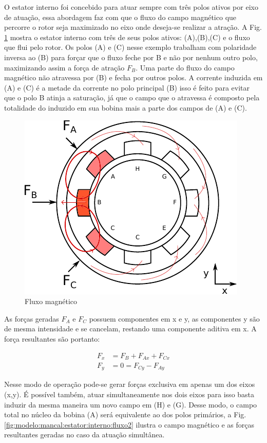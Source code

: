 O estator interno foi concebido para atuar sempre com três polos ativos por eixo de atuação, essa abordagem faz com que o fluxo do campo magnético que percorre o rotor seja maximizado no eixo onde deseja-se realizar a atração. A Fig. \ref{fig:modelo:mancal:estator:interno:fluxo} mostra o estator interno com três de seus polos ativos: (A),(B),(C) e o fluxo que flui pelo rotor. Os polos (A) e (C) nesse exemplo trabalham com polaridade inversa ao (B) para forçar que o fluxo feche por B e não por nenhum outro polo, maximizando assim a força de atração $F_B$. Uma parte do fluxo do campo magnético não atravessa por (B) e fecha por outros polos. A corrente induzida em (A) e (C) é a metade da corrente no polo principal (B) isso é feito para evitar que o polo B atinja a saturação, já que o campo que o atravessa é composto pela totalidade do induzido em sua bobina mais a parte dos campos de (A) e (C).

\begin{figure}[ht!]
	\centering
	\includegraphics[width=0.7\linewidth]{./Figs/modelo_mancal_estator_interno_fluxo}
	\caption{Fluxo magnético}
	\label{fig:modelo:mancal:estator:interno:fluxo}
\end{figure}

As forças geradas $F_A$ e $F_C$ possuem componentes em x e y, as componentes y são de mesma intensidade e se cancelam, restando uma componente aditiva em x. A força resultantes são portanto:

\begin{align}
 	F_x &= F_B + F_{Ax} + F_{Cx} \\
 	F_y &= 0 = F_{Cy} - F_{Ay} 
\end{align}


Nesse modo de operação pode-se gerar forças exclusiva em apenas um dos eixos (x,y). É possível também, atuar simultaneamente nos dois eixos para isso basta induzir da mesma maneira um novo campo em (H) e (G). Desse modo, o campo total no núcleo da bobina (A) será equivalente ao dos polos primários, a Fig. \ref{fig:modelo:mancal:estator:interno:fluxo2} ilustra o campo magnético e as forças resultantes geradas no caso da atuação simultânea.


